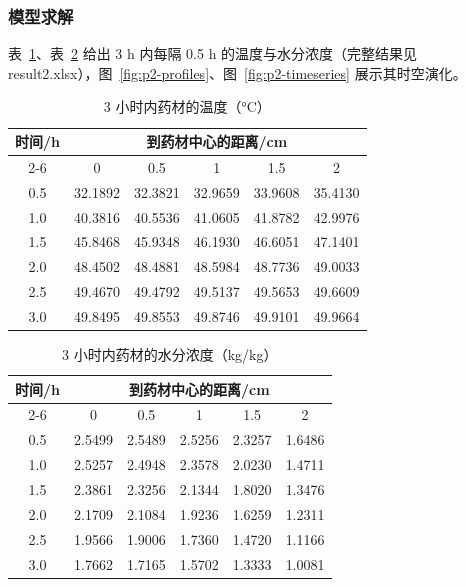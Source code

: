 \subsubsection{模型求解}

表~\ref{tab:p2-temperature}、表~\ref{tab:p2-moisture} 给出 3 h 内每隔 0.5 h 的温度与水分浓度（完整结果见 result2.xlsx），图~\ref{fig:p2-profiles}、图~\ref{fig:p2-timeseries} 展示其时空演化。

\begin{table}[htbp]
	\caption{3 小时内药材的温度（°C）}
	\label{tab:p2-temperature}
	\centering
	\begin{tabular}{cccccc}
		\toprule
		\multirow{2}{*}{时间/h} & \multicolumn{5}{c}{到药材中心的距离/cm} \\
		\cmidrule(lr){2-6}
		 & 0 & 0.5 & 1 & 1.5 & 2 \\
		\midrule
		0.5 & 32.1892 & 32.3821 & 32.9659 & 33.9608 & 35.4130 \\
		1.0 & 40.3816 & 40.5536 & 41.0605 & 41.8782 & 42.9976 \\
		1.5 & 45.8468 & 45.9348 & 46.1930 & 46.6051 & 47.1401 \\
		2.0 & 48.4502 & 48.4881 & 48.5984 & 48.7736 & 49.0033 \\
		2.5 & 49.4670 & 49.4792 & 49.5137 & 49.5653 & 49.6609 \\
		3.0 & 49.8495 & 49.8553 & 49.8746 & 49.9101 & 49.9664 \\
		\bottomrule
	\end{tabular}
\end{table}

\begin{table}[htbp]
	\caption{3 小时内药材的水分浓度（kg/kg）}
	\label{tab:p2-moisture}
	\centering
	\begin{tabular}{cccccc}
		\toprule
		\multirow{2}{*}{时间/h} & \multicolumn{5}{c}{到药材中心的距离/cm} \\
		\cmidrule(lr){2-6}
		 & 0 & 0.5 & 1 & 1.5 & 2 \\
		\midrule
		0.5 & 2.5499 & 2.5489 & 2.5256 & 2.3257 & 1.6486 \\
		1.0 & 2.5257 & 2.4948 & 2.3578 & 2.0230 & 1.4711 \\
		1.5 & 2.3861 & 2.3256 & 2.1344 & 1.8020 & 1.3476 \\
		2.0 & 2.1709 & 2.1084 & 1.9236 & 1.6259 & 1.2311 \\
		2.5 & 1.9566 & 1.9006 & 1.7360 & 1.4720 & 1.1166 \\
		3.0 & 1.7662 & 1.7165 & 1.5702 & 1.3333 & 1.0081 \\
		\bottomrule
	\end{tabular}
\end{table}

